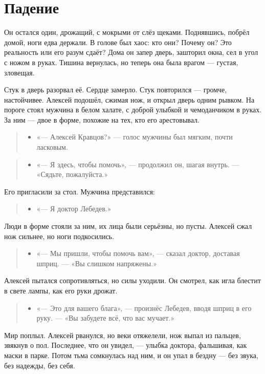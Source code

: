 \documentclass[12pt,a4paper]{book}
\newenvironment{dialogue}{\begin{quote}\itshape\begin{itemize}\item[]}{\end{itemize}\end{quote}}
\begin{document}
\section{Падение}

Он остался один, дрожащий, с мокрыми от слёз щеками. Поднявшись, побрёл домой, ноги едва держали. В голове был хаос: кто они? Почему он? Это реальность или его разум сдаёт? Дома он запер дверь, зашторил окна, сел в угол с ножом в руках. Тишина вернулась, но теперь она была врагом — густая, зловещая.

Стук в дверь разорвал её. Сердце замерло. Стук повторился — громче, настойчивее. Алексей подошёл, сжимая нож, и открыл дверь одним рывком. На пороге стоял мужчина в белом халате, с доброй улыбкой и чемоданчиком в руках. За ним — двое в форме, похожие на тех, кто его арестовывал.

\begin{dialogue}
«— Алексей Кравцов?» — голос мужчины был мягким, почти ласковым.
\end{dialogue}

\begin{dialogue}
«— Я здесь, чтобы помочь», — продолжил он, шагая внутрь. — «Сядьте, пожалуйста.»
\end{dialogue}

Его пригласили за стол. Мужчина представился:

\begin{dialogue}
«— Я доктор Лебедев.»
\end{dialogue}

Люди в форме стояли за ним, их лица были серьёзны, но пусты. Алексей сжал нож сильнее, но ноги подкосились.

\begin{dialogue}
«— Мы пришли, чтобы помочь вам», — сказал доктор, доставая шприц. — «Вы слишком напряжены.»
\end{dialogue}

Алексей пытался сопротивляться, но силы уходили. Он смотрел, как игла блестит в свете лампы, как его руки дрожат.

\begin{dialogue}
«— Это для вашего блага», — произнёс Лебедев, вводя шприц в его руку. — «Вы забудете всё, что вас мучает.»
\end{dialogue}

Мир поплыл. Алексей рванулся, но веки отяжелели, нож выпал из пальцев, звякнув о пол. Последнее, что он увидел, — улыбка доктора, фальшивая, как маски в парке. Потом тьма сомкнулась над ним, и он упал в бездну — без звука, без надежды, без себя.
\end{document}
